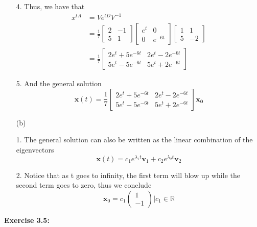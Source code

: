 \documentclass[12pt]{article}
\begin{document}
\begin{enumerate}
        4. Thus, we have that
        \begin{align*}
          x^{tA} & = Ve^{tD}V^{-1}                                                                                                                                                 \\
                 & = \frac{1}{7} \begin{bmatrix} 2 & -1 \\ 5 &  1\end{bmatrix} \begin{bmatrix} e^t & 0 \\ 0 & e^{-6t} \end{bmatrix}  \begin{bmatrix} 1 & 1 \\ 5 &  -2\end{bmatrix} \\
                 & = \frac{1}{7} \begin{bmatrix} 2e^t + 5e^{-6t} & 2e^t - 2e^{-6t} \\ 5e^t-5e^{-6t} &  5e^t+2e^{-6t} \end{bmatrix}
        \end{align*}

        5. And the general solution
        \[
          \mathbf{x}(t) = \frac{1}{7} \begin{bmatrix} 2e^t + 5e^{-6t} & 2e^t - 2e^{-6t} \\ 5e^t-5e^{-6t} &  5e^t+2e^{-6t} \end{bmatrix} \mathbf{x_0}
        \]

  \item [(b)]

        1. The general solution can also be written as the linear combination of the eigenvectors
        \[
          \mathbf{x}(t) = c_1e^{\lambda_{1}t}\mathbf{v}_1 + c_2e^{\lambda_{2}t}\mathbf{v}_2
        \]

        2. Notice that as t goes to infinity, the first term will blow up while the second term goes to zero, thus we conclude
        \[
          \mathbf{x}_0 = c_1\begin{pmatrix} 1 \\ -1 \end{pmatrix} | c_1 \in{\mathbb{R}}
        \]

\end{enumerate}

\noindent \textbf{Exercise 3.5:}
\end{document}
